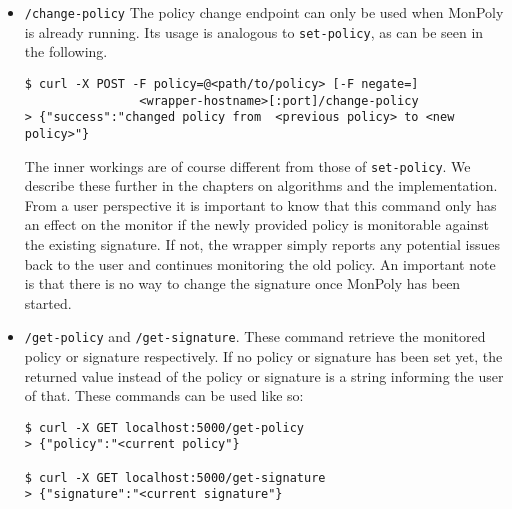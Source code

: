\begin{itemize}
    \item \texttt{/change-policy}
    The policy change endpoint can only be used when MonPoly is already running.
    Its usage is analogous to \texttt{set-policy}, as can be seen in the following.
    \begin{verbatim}
$ curl -X POST -F policy=@<path/to/policy> [-F negate=]
                <wrapper-hostname>[:port]/change-policy
> {"success":"changed policy from  <previous policy> to <new policy>"}
    \end{verbatim}
    The inner workings are of course different from those of \texttt{set-policy}.
    We describe these further in the chapters on algorithms and the implementation.
    From a user perspective it is important to know that this command only has an effect on the monitor if the newly provided policy is monitorable against the existing signature.
    If not, the wrapper simply reports any potential issues back to the user and continues monitoring the old policy.
    An important note is that there is no way to change the signature once MonPoly has been started.
    \item \texttt{/get-policy} and \texttt{/get-signature}.
    These command retrieve the monitored policy or signature respectively.
    If no policy or signature has been set yet, the returned value instead of the policy or signature is a string informing the user of that.
    These commands can be used like so:
    \begin{verbatim}
$ curl -X GET localhost:5000/get-policy
> {"policy":"<current policy"}

$ curl -X GET localhost:5000/get-signature
> {"signature":"<current signature"}
    \end{verbatim}


\end{itemize}
